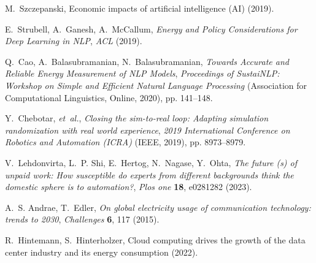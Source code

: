 \documentclass[12pt]{article}
\begin{document}
\renewcommand\refname{References and Notes}
%
%
\begin{thebibliography}{10}
	
	M.~Szczepanski, Economic impacts of artificial intelligence ({AI}) (2019).
	
	E.~Strubell, A.~Ganesh, A.~McCallum, {\it Energy and Policy Considerations for
		Deep Learning in NLP\/}, {\it ACL\/} (2019).
	
	Q.~Cao, A.~Balasubramanian, N.~Balasubramanian, {\it Towards Accurate and
		Reliable Energy Measurement of {NLP} Models\/}, {\it Proceedings of
		SustaiNLP: Workshop on Simple and Efficient Natural Language Processing\/}
	(Association for Computational Linguistics, Online, 2020), pp. 141--148.
	
	Y.~Chebotar, {\it et~al.\/}, {\it Closing the sim-to-real loop: Adapting
		simulation randomization with real world experience\/}, {\it 2019
		International Conference on Robotics and Automation (ICRA)\/} (IEEE, 2019),
	pp. 8973--8979.
	
	V.~Lehdonvirta, L.~P. Shi, E.~Hertog, N.~Nagase, Y.~Ohta, {\it The future (s)
		of unpaid work: How susceptible do experts from different backgrounds think
		the domestic sphere is to automation?\/}, {\it Plos one\/} {\bf 18}, e0281282
	(2023).
	
	A.~S. Andrae, T.~Edler, {\it On global electricity usage of communication
		technology: trends to 2030\/}, {\it Challenges\/} {\bf 6}, 117 (2015).
	
	R.~Hintemann, S.~Hinterholzer, Cloud computing drives the growth of the data
	center industry and its energy consumption (2022).
	

\end{thebibliography}
\end{document}
